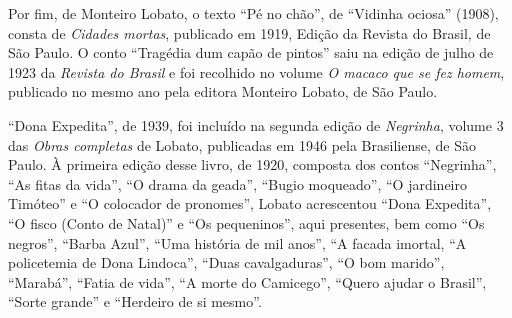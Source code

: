 Por fim, de Monteiro Lobato, o texto ``Pé no chão'', de ``Vidinha
ociosa'' (1908), consta de \emph{Cidades mortas}, publicado em 1919,
Edição da Revista do Brasil, de São Paulo. O conto ``Tragédia dum capão
de pintos'' saiu na edição de julho de 1923 da \emph{Revista do Brasil}
e foi recolhido no volume \emph{O macaco que se fez homem}, publicado no
mesmo ano pela editora Monteiro Lobato, de São Paulo.

``Dona Expedita'', de 1939, foi incluído na segunda edição de
\emph{Negrinha}, volume 3 das \emph{Obras completas} de Lobato,
publicadas em 1946 pela Brasiliense, de São Paulo. À primeira edição
desse livro, de 1920, composta dos contos ``Negrinha'', ``As fitas da
vida'', ``O drama da geada'', ``Bugio moqueado'', ``O jardineiro
Timóteo'' e ``O colocador de pronomes'', Lobato acrescentou ``Dona
Expedita'', ``O fisco (Conto de Natal)'' e ``Os pequeninos'', aqui
presentes, bem como ``Os negros'', ``Barba Azul'', ``Uma história de mil
anos'', ``A facada imortal, ``A policetemia de Dona Lindoca'', ``Duas
cavalgaduras'', ``O bom marido'', ``Marabá'', ``Fatia de vida'', ``A
morte do Camicego'', ``Quero ajudar o Brasil'', ``Sorte grande'' e
``Herdeiro de si mesmo''.
